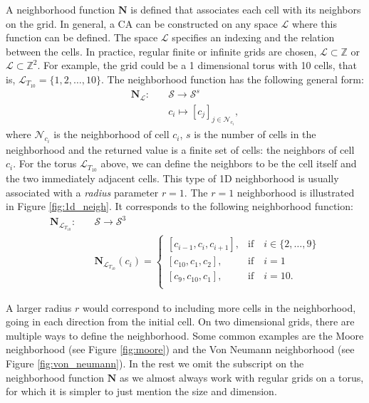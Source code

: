 A neighborhood function $\boldsymbol{N}$ is defined that associates each cell
with its neighbors on the grid. In general, a \ac{CA} can be constructed on any
space $\mathcal{L}$ where this function can be defined. The space $\mathcal{L}$ specifies an
indexing and the relation between the cells. In practice, regular finite or
infinite grids are chosen, $\mathcal{L} \subset \mathbb{Z}$ or $\mathcal{L} \subset \mathbb{Z}^{2}$. For example, the grid could
be a 1 dimensional torus with 10 cells, that is,
$\mathcal{L}_{{T_{10}}} = \{1, 2, \ldots, 10 \}$. The neighborhood function has the following
general form:
\begin{equation}
  \begin{aligned}
\boldsymbol{N}_{\mathcal{L}} :\quad & \mathcal{S} \rightarrow \mathcal{S}^{s}\\
&c_{i} \mapsto [c_{j}]_{j\in \mathcal{N}_{c_{i}}},
  \end{aligned}
\end{equation}
where $\mathcal{N}_{c_{i}}$ is the neighborhood of cell $c_{i}$, $s$ is the
number of cells in the neighborhood and the returned value is a finite set of
cells: the neighbors of cell $c_{i}$. For the torus $\mathcal{L}_{T_{10}}$
above, we can define the neighbors to be the cell itself and the two immediately
adjacent cells. This type of 1D neighborhood is usually associated with a
\emph{radius} parameter $r = 1$. The $r=1$ neighborhood is illustrated in Figure
\ref{fig:1d_neigh}. It corresponds to the following neighborhood function:
\begin{equation}
  \begin{aligned}
\boldsymbol{N}_{\mathcal{L}_{T_{10}}} :\quad & \mathcal{S} \rightarrow \mathcal{S}^{3} \\
&\boldsymbol{N}_{\mathcal{L}_{T_{10}}}(c_{i}) = \begin{cases}
                      [c_{i - 1}, c_{i}, c_{i + 1}],& \text{if}\quad i \in \{2,\ldots , 9\}\\
                       [c_{10}, c_{1}, c_{2}], & \text{if} \quad i = 1 \\
                       [c_{9}, c_{10}, c_{1}], & \text{if} \quad i = 10. \\
                    \end{cases}
  \end{aligned}
  \label{eq:torus_index}
\end{equation}

A larger radius $r$ would correspond to including more cells in the
neighborhood, going in each direction from the initial cell. On two dimensional
grids, there are multiple ways to define the neighborhood. Some common examples
are the Moore neighborhood (see Figure \ref{fig:moore}) and the Von Neumann
neighborhood (see Figure \ref{fig:von_neumann}). In the rest we omit the
subscript on the neighborhood function $\boldsymbol{N}$ as we almost always work
with regular grids on a torus, for which it is simpler to just mention the size
and dimension.

